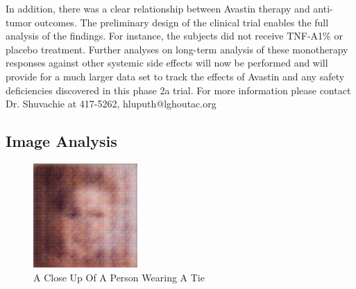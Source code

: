 \documentclass{article}%
\begin{document}
In addition, there was a clear relationship between Avastin therapy and anti{-}tumor outcomes.\newline%
The preliminary design of the clinical trial enables the full analysis of the findings. For instance, the subjects did not receive TNF{-}A1\% or placebo treatment. Further analyses on long{-}term analysis of these monotherapy responses against other systemic side effects will now be performed and will provide for a much larger data set to track the effects of Avastin and any safety deficiencies discovered in this phase 2a trial.\newline%
For more information please contact Dr. Shuvachie at 417{-}5262, hluputh@lghoutac.org

%
\subsection{Image Analysis}%
\label{subsec:ImageAnalysis}%


\begin{figure}[h!]%
\centering%
\includegraphics[width=150px]{500_fake_images/samples_5_429.png}%
\caption{A Close Up Of A Person Wearing A Tie}%
\end{figure}

%
\end{document}
